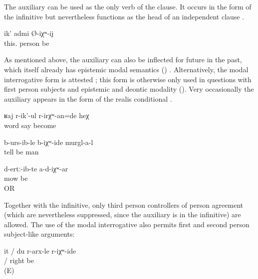 The auxiliary can be used as the only verb of the clause. It occurs in the form of the infinitive but nevertheless functions as the head of an independent clause .
%
\begin{exe}
	\ex	\label{ex:This is probably a man.}
	\gll	ik'	admi	Ø-iχʷ-ij\\
		this.	person	be\\
	\glt	{}
\end{exe}

As mentioned above, the auxiliary can also be inflected for future in the past, which itself already has epistemic modal semantics () . Alternatively, the modal interrogative form is attested ; this form is otherwise only used in questions with first person subjects and epistemic and deontic modality (). Very occasionally the auxiliary appears in the form of the realis conditional .
%
\begin{exe}
	\ex	\label{ex:‎She must have been scolding / probably she was scolding}
	\gll	ʁaj	r-ik'-ul	r-irχʷ-an=de	heχ\\
		word	say	become	\\
	\glt	{}

	\ex	\label{ex:‎Probably the men had already told it}
	\gll	b-urs-ib-le	b-iχʷ-ide	murgl-a-l\\
		tell	be	man	\\
	\glt	{}

	\ex	\label{ex:‎‎This is probably mowed (grass).}
	\gll	d-ertː-ib-te	a-d-iχʷ-ar\\
		mow 	be\\
	\glt	{} OR 
\end{exe}

Together with the infinitive, only third person controllers of person agreement (which are nevertheless suppressed, since the auxiliary is in the infinitive) are allowed. The use of the modal interrogative also permits first and second person subject-like arguments:
%
\begin{exe}
	\ex	\label{ex:She / I was probably right}
	\gll	it	/	du	r-arx-le	r-iχʷ-ide\\
			/		right	be\\
	\glt	{} (E)
\end{exe}


